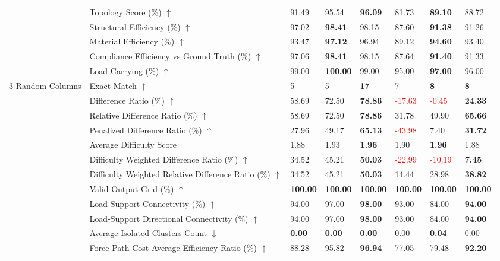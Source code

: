 \begin{table}[!h]
{\begin{tabular}{lllll|lll}
 & Topology Score (\%) $\uparrow$ & 91.49 & 95.54 & \textbf{96.09} & 81.73 & \textbf{89.10} & 88.72 \\
 & Structural Efficiency (\%) $\uparrow$ & 97.02 & \textbf{98.41} & 98.15 & 87.60 & \textbf{91.38} & 91.26 \\
 & Material Efficiency (\%) $\uparrow$ & 93.47 & \textbf{97.12} & 96.94 & 89.12 & \textbf{94.60} & 93.40 \\
 & Compliance Efficiency vs Ground Truth (\%) $\uparrow$ & 97.06 & \textbf{98.41} & 98.15 & 87.64 & \textbf{91.40} & 91.33 \\
 & Load Carrying (\%) $\uparrow$ & 99.00 & \textbf{100.00} & 99.00 & 95.00 & \textbf{97.00} & 96.00 \\
\midrule
3 Random Columns & Exact Match $\uparrow$ & 5 & 5 & \textbf{17} & 7 & \textbf{8} & \textbf{8} \\
 & Difference Ratio (\%) $\uparrow$ & 58.69 & 72.50 & \textbf{78.86} & \textcolor{red}{-17.63} & \textcolor{red}{-0.45} & \textbf{24.33} \\
 & Relative Difference Ratio (\%) $\uparrow$ & 58.69 & 72.50 & \textbf{78.86} & 31.78 & 49.90 & \textbf{65.66} \\
 & Penalized Difference Ratio (\%) $\uparrow$ & 27.96 & 49.17 & \textbf{65.13} & \textcolor{red}{-43.98} & 7.40 & \textbf{31.72} \\
 & Average Difficulty Score & 1.88 & 1.93 & \textbf{1.96} & 1.90 & \textbf{1.96} & 1.88 \\
 & Difficulty Weighted Difference Ratio (\%) $\uparrow$ & 34.52 & 45.21 & \textbf{50.03} & \textcolor{red}{-22.99} & \textcolor{red}{-10.19} & \textbf{7.45} \\
 & Difficulty Weighted Relative Difference Ratio (\%) $\uparrow$ & 34.52 & 45.21 & \textbf{50.03} & 14.44 & 28.98 & \textbf{38.82} \\
 & Valid Output Grid (\%) $\uparrow$ & \textbf{100.00} & \textbf{100.00} & \textbf{100.00} & \textbf{100.00} & \textbf{100.00} & \textbf{100.00} \\
 & Load-Support Connectivity (\%) $\uparrow$ & 94.00 & 97.00 & \textbf{98.00} & 93.00 & 84.00 & \textbf{94.00} \\
 & Load-Support Directional Connectivity (\%) $\uparrow$ & 94.00 & 97.00 & \textbf{98.00} & 93.00 & 84.00 & \textbf{94.00} \\
 & Average Isolated Clusters Count $\downarrow$ & \textbf{0.00} & \textbf{0.00} & \textbf{0.00} & 0.00 & \textbf{0.04} & 0.00 \\
 & Force Path Cost Average Efficiency Ratio (\%) $\uparrow$ & 88.28 & 95.82 & \textbf{96.94} & 77.05 & 79.48 & \textbf{92.20} \\

\end{tabular}}
\end{table}
